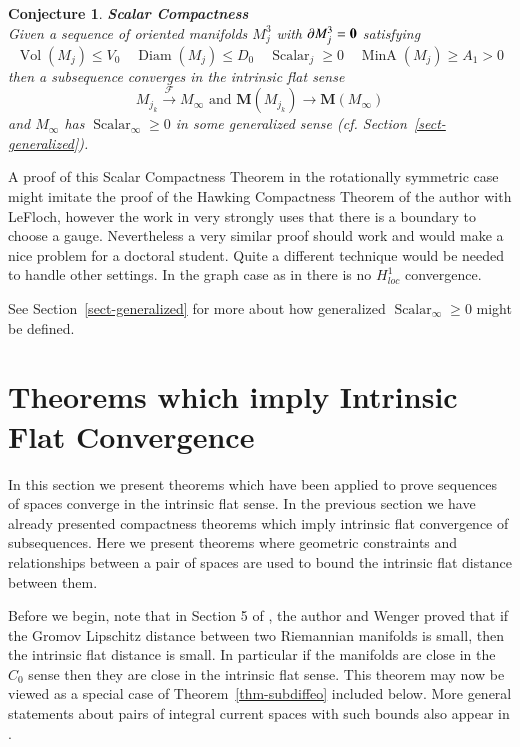 \documentclass[12pt]{amsart}
\newtheorem{conj}[thm]{Conjecture}
\begin{document}
\begin{conj}\label{Scalar-Compactness} {\em \bf Scalar Compactness}\\
Given a sequence of 
 oriented manifolds $M_j^3$ with $\partial M^3_j = {\bf{0}}$
satisfying
\begin{equation}
 {\operatorname{Vol}}(M_j) \le V_0\quad {\operatorname{Diam}}(M_j) \le D_0\quad
{\operatorname{Scalar}}_j \ge 0 \quad {\operatorname{MinA}}(M_j) \ge A_1>0
\end{equation}
then a subsequence converges in the intrinsic flat sense
\begin{equation}
M_{j_k} {\stackrel {\mathcal{F}}{\longrightarrow} } M_\infty \textrm{ and } {{\mathbf M}}(M_{j_k}) \to {{\mathbf M}}(M_\infty)
\end{equation}
and $M_\infty$ has ${\operatorname{Scalar}}_\infty\ge 0$
in some generalized sense (cf. Section~\ref{sect-generalized}). 
\end{conj} 

A proof of this Scalar Compactness Theorem 
in the rotationally symmetric case might imitate the proof of
the Hawking Compactness Theorem
of the author with LeFloch, however the work in \cite{LeFloch-Sormani-1} very strongly uses that there is a boundary to choose a gauge.  Nevertheless
a very similar proof should work and would make a nice problem
for a doctoral student.   Quite a different technique would be needed
to handle other settings.  In the graph case 
as in \cite{HLS} there is no $H^1_{loc}$ convergence.

See Section~\ref{sect-generalized} for more about how
generalized ${\operatorname{Scalar}}_\infty\ge 0$ might be defined.

 
\section{Theorems which imply Intrinsic Flat Convergence} \label{sect-cnstr}
 
In this section we present theorems which have been applied to prove 
sequences of spaces converge in the intrinsic flat sense.  In the previous section
we have already presented compactness theorems which imply intrinsic
flat convergence of subsequences.   
Here we present theorems where geometric constraints
and relationships between a pair of spaces are used to bound
the intrinsic flat distance between them.

Before we begin, note that in Section 5 of \cite{SorWen2}, the author and Wenger
proved that if the Gromov Lipschitz distance between two Riemannian
manifolds is small, then the intrinsic flat distance is small.  In particular
if the manifolds are close in the $C_0$ sense then they are close in the
intrinsic flat sense.  This theorem may now be viewed as a special
case of Theorem~\ref{thm-subdiffeo} included below.   More general
statements about pairs of integral current spaces with such bounds
also appear in \cite{SorWen2}.
 
\end{document}
